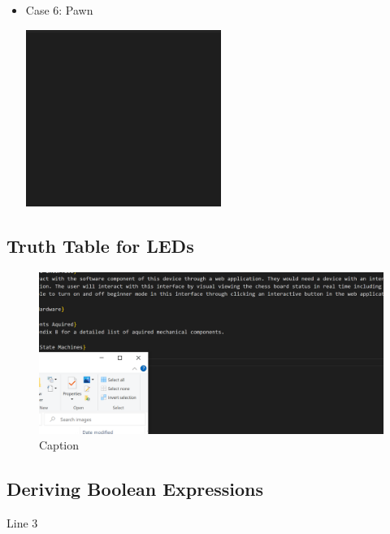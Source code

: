 \documentclass[12pt, titlepage]{article}
\begin{document}
\begin{itemize}
\begin{minipage}{\linewidth}
\end{minipage}
  \item Case 6: Pawn   
  \begin{minipage}{\linewidth}
    \centering
    \includegraphics[width=0.5\textwidth]{pawn}
\end{minipage}
\end{itemize}

\subsection*{Truth Table for LEDs}
\begin{figure}[h]
  \centering
  \includegraphics[width=1\textwidth]{truth_table}
  \caption{Caption}
\end{figure}

\subsection*{Deriving Boolean Expressions}
Line 3
\end{document}
